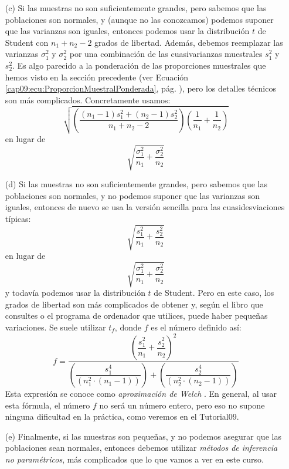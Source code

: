 \begin{enumerate}
    \item[(c)] {\sf Si las muestras no son suficientemente grandes, pero sabemos que las poblaciones son normales, y (aunque no las conozcamos) podemos suponer que las varianzas son iguales}, entonces podemos usar la distribución $t$ de Student con $n_1+n_2-2$ grados de libertad.  Además, debemos reemplazar las varianzas $\sigma_1^2$ y $\sigma_2^2$ por una combinación de las cuasivarianzas muestrales $s_1^2$ y $s_2^2$. Es algo parecido a la ponderación de las proporciones muestrales que hemos visto en la sección precedente (ver Ecuación \ref{cap09:ecu:ProporcionMuestralPonderada}, pág. \pageref{cap09:ecu:ProporcionMuestralPonderada}), pero los detalles técnicos son más complicados.  Concretamente usamos:
        \[\sqrt{\left(\dfrac{(n_1-1)s_1^2+(n_2-1)s_2^2}{n_1+n_2-2}\right)\left(\dfrac{1}{n_1}+\dfrac{1}{n_2}\right)}\]
        en lugar de \[\sqrt{\dfrac{\sigma_1^2}{n_1}+\dfrac{\sigma_2^2}{n_2}}\]
    \item[(d)] {\sf Si las muestras no son suficientemente grandes, pero sabemos que las poblaciones son normales, y {\sc no} podemos suponer que las varianzas son iguales}, entonces de nuevo se usa la versión sencilla para las cuasidesviaciones típicas:
        \[\sqrt{\dfrac{s_1^2}{n_1}+\dfrac{s_2^2}{n_2}}\]
        en lugar de
        \[\sqrt{\dfrac{\sigma_1^2}{n_1}+\dfrac{\sigma_2^2}{n_2}}\]
        y todavía podemos usar la distribución $t$ de Student. Pero en este caso, los grados de
        libertad son más complicados de obtener y, según el libro que consultes o el programa de
        ordenador que utilices,  puede haber pequeñas variaciones. Se suele utilizar $t_f$, donde
        $f$ es el número definido así:
        \begin{equation}\label{ecu:aproximacionWelch}
           f=\dfrac{
           \left(\dfrac{s_1^2}{n_1}+\dfrac{s_2^2}{n_2}\right)^2}{
            \left(\dfrac{s_1^4}{(n_1^2\cdot(n_1-1))}\right) +
            \left(\dfrac{s_2^4}{(n_2^2\cdot(n_2-1))}\right)
            }
        \end{equation}
        Esta expresión se conoce como {\em aproximación de Welch}
        . En general, al usar esta fórmula, el número $f$ no será un
        número entero, pero eso no supone ninguna dificultad en la práctica, como veremos en el
        Tutorial09.
    \item[(e)] Finalmente, {\sf si las muestras son pequeñas, y no podemos asegurar que las poblaciones sean normales}, entonces debemos utilizar {\em métodos de inferencia no paramétricos}, más complicados que lo que vamos a ver en este curso.
\end{enumerate}

